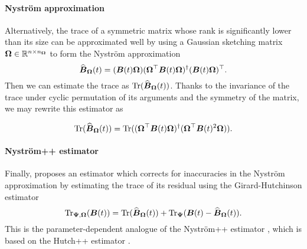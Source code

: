 \documentclass[12pt]{article}
\begin{document}
\paragraph{Nyström approximation} Alternatively, the trace of a symmetric matrix whose rank is significantly lower than its size can be approximated well by using a Gaussian sketching matrix $\boldsymbol{\Omega} \in \mathbb{R}^{n \times n_{\boldsymbol{\Omega}}}$ to form the Nyström approximation \cite{gittens-2013-revisiting-nystrom}
\begin{equation}
    \widehat{\boldsymbol{B}}_{\boldsymbol{\Omega}}(t) = (\boldsymbol{B}(t) \boldsymbol{\Omega}) (\boldsymbol{\Omega}^{\top} \boldsymbol{B}(t) \boldsymbol{\Omega})^{\dagger} (\boldsymbol{B}(t) \boldsymbol{\Omega})^{\top}.
    \label{equ:nystrom-approximation}
\end{equation}
Then we can estimate the trace as $\operatorname{Tr}(\widehat{\boldsymbol{B}}_{\boldsymbol{\Omega}}(t))$. Thanks to the invariance of the trace under cyclic permutation of its arguments and the symmetry of the matrix, we may rewrite this estimator as

\begin{equation}
    \operatorname{Tr}(\widehat{\boldsymbol{B}}_{\boldsymbol{\Omega}}(t)) = \operatorname{Tr}( (\boldsymbol{\Omega}^{\top} \boldsymbol{B}(t) \boldsymbol{\Omega})^{\dagger} ( \boldsymbol{\Omega}^{\top} \boldsymbol{B}(t)^2 \boldsymbol{\Omega})).
    \label{equ:nystrom-trace-estimator}
\end{equation}

\paragraph{Nyström++ estimator} Finally, \cite{lin-2017-randomized-estimation} proposes an estimator which corrects for inaccuracies in the Nyström approximation  by estimating the trace of its residual using the Girard-Hutchinson estimator 
\begin{equation}
    \operatorname{Tr}_{\boldsymbol{\Psi}, \boldsymbol{\Omega}}(\boldsymbol{B}(t)) = \operatorname{Tr}(\widehat{\boldsymbol{B}}_{\boldsymbol{\Omega}}(t)) + \operatorname{Tr}_{\boldsymbol{\Psi}}(\boldsymbol{B}(t) - \widehat{\boldsymbol{B}}_{\boldsymbol{\Omega}}(t)).
    \label{equ:nystrompp-trace-estimator}
\end{equation}
This is the parameter-dependent analogue of the Nyström++ estimator \cite{persson-2022-improved-variants}, which is based on the Hutch++ estimator \cite{meyer-2021-hutch-optimal}. %
\end{document}
